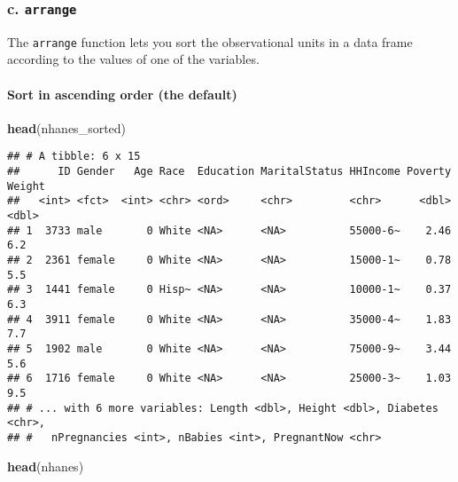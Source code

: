 \documentclass[]{article}
\newenvironment{Shaded}{\begin{snugshade}}{\end{snugshade}}
\newcommand{\KeywordTok}[1]{\textcolor[rgb]{0.13,0.29,0.53}{\textbf{#1}}}
\newcommand{\StringTok}[1]{\textcolor[rgb]{0.31,0.60,0.02}{#1}}
\newcommand{\OperatorTok}[1]{\textcolor[rgb]{0.81,0.36,0.00}{\textbf{#1}}}
\newcommand{\NormalTok}[1]{#1}
\let\oldparagraph\paragraph
\renewcommand{\paragraph}[1]{\oldparagraph{#1}\mbox{}}
\begin{document}
\subsubsection{\texorpdfstring{c.
\texttt{arrange}}{c. arrange}}\label{c.-arrange}

The \texttt{arrange} function lets you sort the observational units in a
data frame according to the values of one of the variables.

\paragraph{Sort in ascending order (the
default)}\label{sort-in-ascending-order-the-default}

\begin{Shaded}
\end{Shaded}

\begin{Shaded}
\begin{Highlighting}[]
\KeywordTok{head}\NormalTok{(nhanes_sorted)}
\end{Highlighting}
\end{Shaded}

\begin{verbatim}
## # A tibble: 6 x 15
##      ID Gender   Age Race  Education MaritalStatus HHIncome Poverty Weight
##   <int> <fct>  <int> <chr> <ord>     <chr>         <chr>      <dbl>  <dbl>
## 1  3733 male       0 White <NA>      <NA>          55000-6~    2.46    6.2
## 2  2361 female     0 White <NA>      <NA>          15000-1~    0.78    5.5
## 3  1441 female     0 Hisp~ <NA>      <NA>          10000-1~    0.37    6.3
## 4  3911 female     0 White <NA>      <NA>          35000-4~    1.83    7.7
## 5  1902 male       0 White <NA>      <NA>          75000-9~    3.44    5.6
## 6  1716 female     0 White <NA>      <NA>          25000-3~    1.03    9.5
## # ... with 6 more variables: Length <dbl>, Height <dbl>, Diabetes <chr>,
## #   nPregnancies <int>, nBabies <int>, PregnantNow <chr>
\end{verbatim}

\begin{Shaded}
\begin{Highlighting}[]
\KeywordTok{head}\NormalTok{(nhanes)}
\end{Highlighting}
\end{Shaded}
\end{document}
